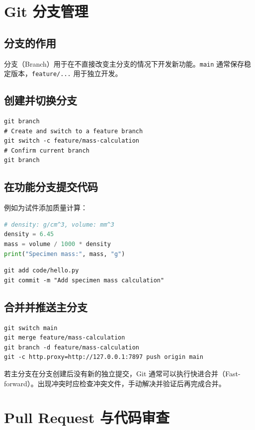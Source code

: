 \section{Git 分支管理}
\subsection{分支的作用}
分支（Branch）用于在不直接改变主分支的情况下开发新功能。\texttt{main} 通常保存稳定版本，\texttt{feature/...} 用于独立开发。
\subsection{创建并切换分支}
\begin{lstlisting}
git branch
# Create and switch to a feature branch
git switch -c feature/mass-calculation
# Confirm current branch
git branch
\end{lstlisting}
\subsection{在功能分支提交代码}
例如为试件添加质量计算：
\begin{lstlisting}[language=Python]
# density: g/cm^3, volume: mm^3
density = 6.45
mass = volume / 1000 * density
print("Specimen mass:", mass, "g")
\end{lstlisting}
\begin{lstlisting}
git add code/hello.py
git commit -m "Add specimen mass calculation"
\end{lstlisting}
\subsection{合并并推送主分支}
\begin{lstlisting}
git switch main
git merge feature/mass-calculation
git branch -d feature/mass-calculation
git -c http.proxy=http://127.0.0.1:7897 push origin main
\end{lstlisting}
若主分支在分支创建后没有新的独立提交，Git 通常可以执行快进合并（Fast-forward）。出现冲突时应检查冲突文件，手动解决并验证后再完成合并。

\section{Pull Request 与代码审查}
